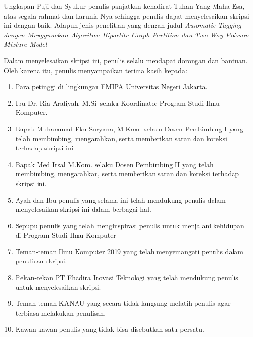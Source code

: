 \documentclass{jtetiskripsi}
\begin{document}
\cover

% 



\preface

Ungkapan Puji dan Syukur penulis panjatkan kehadirat Tuhan Yang Maha Esa, atas segala rahmat dan karunia-Nya sehingga penulis dapat menyelesaikan skripsi ini dengan baik. Adapun jenis penelitian yang dengan judul \textit{Automatic Tagging dengan Menggunakan Algoritma Bipartite Graph Partition dan Two Way Poisson Mixture Model}

Dalam menyelesaikan skripsi ini, penulis selalu mendapat dorongan dan bantuan. Oleh karena itu, penulis menyampaikan terima kasih kepada:

\begin{enumerate}
  \item Para petinggi di lingkungan FMIPA Universitas Negeri Jakarta.
  \item Ibu Dr. Ria Arafiyah, M.Si. selaku Koordinator Program Studi Ilmu Komputer.
  \item Bapak Muhammad Eka Suryana, M.Kom. selaku Dosen Pembimbing I yang telah membimbing, mengarahkan, serta memberikan saran dan koreksi terhadap skripsi ini.
  \item Bapak Med Irzal M.Kom. selaku Dosen Pembimbing II yang telah membimbing, mengarahkan, serta memberikan saran dan koreksi terhadap skripsi ini.
  \item Ayah dan Ibu penulis yang selama ini telah mendukung penulis dalam menyelesaikan skripsi ini dalam berbagai hal.
  \item Sepupu penulis yang telah menginspirasi penulis untuk menjalani kehidupan di Program Studi Ilmu Komputer.
  \item Teman-teman Ilmu Komputer 2019 yang telah menyemangati penulis dalam penulisan skripsi.
  \item Rekan-rekan PT Fhadira Inovasi Teknologi yang telah mendukung penulis untuk menyelesaikan skripsi.
  \item Teman-teman KANAU yang secara tidak langsung melatih penulis agar terbiasa melakukan penulisan.
  \item Kawan-kawan penulis yang tidak bisa disebutkan satu persatu.
\end{enumerate}
\end{document}
